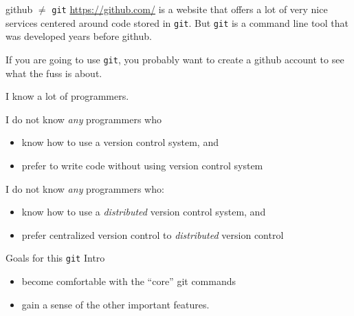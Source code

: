 \documentclass[xcolor=dvipsnames,compress,12pt]{beamer}
\begin{document}
\begin{frame}{github $\neq$ {\tt git}}
\Large
\url{https://github.com/} is a website that offers a lot of very nice services centered around code stored in {\tt git}. But {\tt git} is a command line tool that was developed years before github.

If you are going to use {\tt git}, you probably want to create a github account to see what the fuss is about.
\end{frame}



\begin{frame}{}
\Large
I know a lot of programmers.\par

I do not know {\em any} programmers who
\begin{itemize}
    \item know how to use a version control system, and
    \item prefer to write code without using version control system
\end{itemize}
\end{frame}

\begin{frame}{}
\Large

I do not know {\em any} programmers who:
\begin{itemize}
    \item know how to use a {\em distributed} version control system, and
    \item prefer centralized version control to {\em distributed} version control
\end{itemize}
\end{frame}


\begin{frame}{Goals for this {\tt git} Intro}
\Large
\begin{itemize}
    \item become comfortable with the ``core'' git commands
    \item gain a sense of the other important features.
\end{itemize}

\end{frame}
\end{document}
